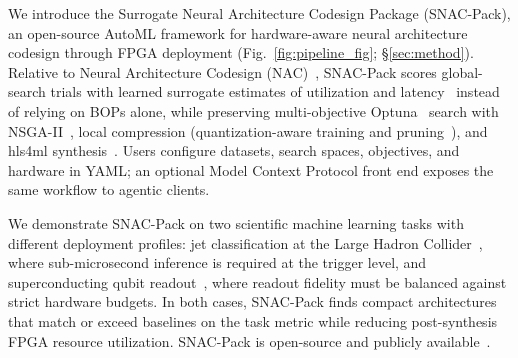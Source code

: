 \documentclass[11pt]{article}
\begin{document}

We introduce the Surrogate Neural Architecture Codesign Package (SNAC-Pack), an open-source AutoML framework for hardware-aware neural architecture codesign through FPGA deployment (Fig.~\ref{fig:pipeline_fig}; \S\ref{sec:method}).
Relative to Neural Architecture Codesign (NAC)~\citep{Weitz_2025}, SNAC-Pack scores global-search trials with learned surrogate estimates of utilization and latency~\citep{Rahimifar_2025} instead of relying on BOPs alone, while preserving multi-objective Optuna~\citep{optuna_2019} search with NSGA-II~\citep{NSGA}, local compression (quantization-aware training and pruning~\citep{quantization_survey,modelcompression}), and hls4ml synthesis~\citep{Schulte:2025mai,hls4ml,fastml_hls4ml}.
Users configure datasets, search spaces, objectives, and hardware in YAML; an optional Model Context Protocol front end exposes the same workflow to agentic clients.


We demonstrate SNAC-Pack on two scientific machine learning tasks with different deployment profiles: jet classification at the Large Hadron Collider~\citep{pierini_2020_3602260}, where sub-microsecond inference is required at the trigger level, and superconducting qubit readout~\citep{diguglielmo2025endtoendworkflowmachinelearningbased}, where readout fidelity must be balanced against strict hardware budgets.
In both cases, SNAC-Pack finds compact architectures that match or exceed baselines on the task metric while reducing post-synthesis FPGA resource utilization.
SNAC-Pack is open-source and publicly available~\citep{dmitri_demler_2026_19202843}.
\end{document}
